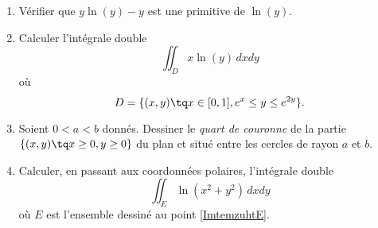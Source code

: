 
\begin{exercice}\label{exoOutilsMath-0128}

    \begin{enumerate}
        \item
            Vérifier que \( y\ln(y)-y\) est une primitive de \( \ln(y)\).
        \item
            Calculer l'intégrale double
            \begin{equation}
                \iint_Dx\ln(y)\,dxdy
            \end{equation}
            où
            \begin{equation}
                D=\{ (x,y)\tq x\in\mathopen[ 0 , 1 \mathclose], e^{x}\leq y\leq  e^{2y} \}.
            \end{equation}
        \item   \label{ImtemzuhtE}
            Soient \( 0<a<b\) donnés. Dessiner le \emph{quart de couronne} de la partie \( \{ (x,y)\tq x\geq 0,y\geq 0 \}\) du plan et situé entre les cercles de rayon \( a\) et \( b\).
        \item
            Calculer, en passant aux coordonnées polaires, l'intégrale double
            \begin{equation}
                \iint_E\ln(x^2+y^2)\,dxdy
            \end{equation}
            où \( E\) est l'ensemble dessiné au point \ref{ImtemzuhtE}.
    \end{enumerate}
    

\end{exercice}
